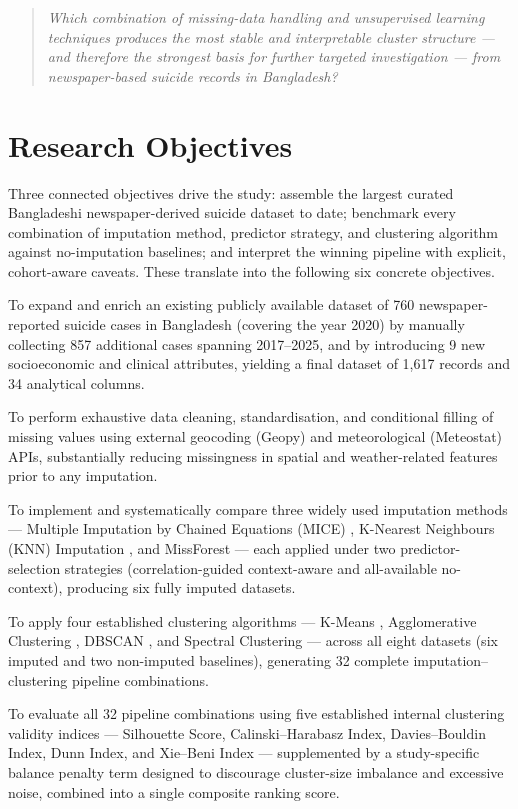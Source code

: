 \begin{quote}
\itshape
Which combination of missing-data handling and unsupervised learning techniques produces the most stable and interpretable cluster structure --- and therefore the strongest basis for further targeted investigation --- from newspaper-based suicide records in Bangladesh?
\end{quote}

\section{Research Objectives}

Three connected objectives drive the study: assemble the largest curated Bangladeshi newspaper-derived suicide dataset to date; benchmark every combination of imputation method, predictor strategy, and clustering algorithm against no-imputation baselines; and interpret the winning pipeline with explicit, cohort-aware caveats. These translate into the following six concrete objectives.

To expand and enrich an existing publicly available dataset of 760 newspaper-reported suicide cases in Bangladesh (covering the year 2020) by manually collecting 857 additional cases spanning 2017--2025, and by introducing 9 new socioeconomic and clinical attributes, yielding a final dataset of 1,617 records and 34 analytical columns.

To perform exhaustive data cleaning, standardisation, and conditional filling of missing values using external geocoding (Geopy) and meteorological (Meteostat) APIs, substantially reducing missingness in spatial and weather-related features prior to any imputation.

To implement and systematically compare three widely used imputation methods --- Multiple Imputation by Chained Equations (MICE) \cite{ref10}, K-Nearest Neighbours (KNN) Imputation \cite{ref11}, and MissForest \cite{ref12} --- each applied under two predictor-selection strategies (correlation-guided context-aware and all-available no-context), producing six fully imputed datasets.

To apply four established clustering algorithms --- K-Means \cite{ref13}, Agglomerative Clustering \cite{ref14}, DBSCAN \cite{ref15}, and Spectral Clustering \cite{ref16} --- across all eight datasets (six imputed and two non-imputed baselines), generating 32 complete imputation--clustering pipeline combinations.

To evaluate all 32 pipeline combinations using five established internal clustering validity indices --- Silhouette Score, Calinski--Harabasz Index, Davies--Bouldin Index, Dunn Index, and Xie--Beni Index --- supplemented by a study-specific balance penalty term designed to discourage cluster-size imbalance and excessive noise, combined into a single composite ranking score.

